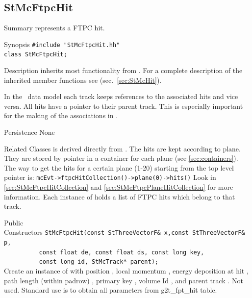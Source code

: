 \subsection{StMcFtpcHit}
 
\label{sec:StMcFtpcHit}
\begin{Entry}
\item[Summary]
     represents a FTPC hit.

\item[Synopsis]
    \verb+#include "StMcFtpcHit.hh"+\\
    \verb+class StMcFtpcHit;+\\

\item[Description]
     inherits most functionality from .  For a complete
    description of the inherited member functions see 
    (sec.~\ref{sec:StMcHit}).

    In the \StMcEvent\ data model each track keeps references to the
    associated hits and vice versa. All hits have a pointer to their
    parent track.  This is especially important for the making of the
    associations in \StAssociationMaker.


\item[Persistence]
    None

\item[Related Classes]
     is derived directly from .
    The hits are kept according to plane.
    They are stored by pointer in a container for each plane
    (see \ref{sec:containers}).  The way to get the hits for a
    certain plane (1-20) starting
    from the top level  pointer is:
    \verb+mcEvt->ftpcHitCollection()->plane(0)->hits()+
    Look in \ref{sec:StMcFtpcHitCollection} and
    \ref{sec:StMcFtpcPlaneHitCollection} for more information.
    Each instance of  holds a list of FTPC hits
    which belong to that track.

\item[Public\\ Constructors]
    \verb+StMcFtpcHit(const StThreeVectorF& x,const StThreeVectorF& p, +\\
    \verb+          const float de, const float ds, const long key,+\\
    \verb+          const long id, StMcTrack* parent);+\\
    Create an instance of  with position , local momentum ,
    energy deposition at hit , path length (within padrow) , primary key ,
    volume Id ,
    and parent track .  Not used.  Standard use is
    to obtain all parameters from g2t\_fpt\_hit table.


\end{Entry}
